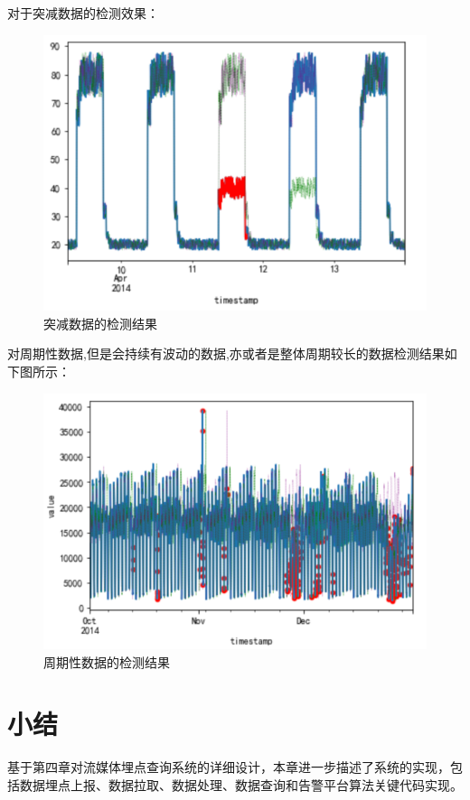 \begin{longtable}[htbp]
对于突减数据的检测效果：
\begin{figure}[htbp]
  \centering
  \includegraphics[scale=0.75]{figure/chapter5/突减数据的检测结果.png}
  \caption{突减数据的检测结果}\label{tujianshujujiance}
\end{figure}

对周期性数据,但是会持续有波动的数据,亦或者是整体周期较长的数据检测结果如下图所示：

\begin{figure}[htbp]
  \centering
  \includegraphics[scale=0.8]{figure/chapter5/周期性数据的检测结果.png}
  \caption{周期性数据的检测结果}\label{zhouqixingshujujiance}
\end{figure}

\section{小结}
基于第四章对流媒体埋点查询系统的详细设计，本章进一步描述了系统的实现，包括数据埋点上报、数据拉取、数据处理、数据查询和告警平台算法关键代码实现。


\end{longtable}
